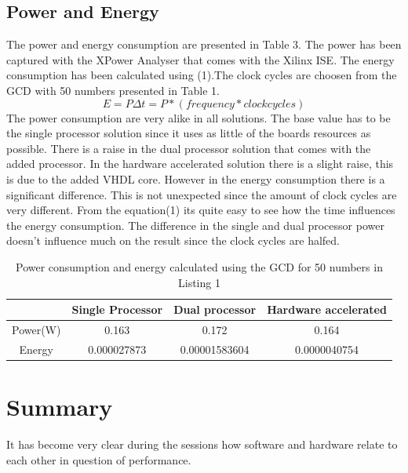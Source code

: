 \documentclass[11pt]{article}
\begin{document}
\subsection{Power and Energy}
The power and energy consumption are presented in Table 3. The power has been captured with the XPower Analyser that comes with the Xilinx ISE. The energy consumption has been calculated using (1).The clock cycles are choosen from the GCD with 50 numbers presented in Table 1. 
\begin{equation}
E = P \Delta t = P *(frequency*clock cycles)
\end{equation}
The power consumption are very alike in all solutions. The base value has to be the single processor solution since it uses as little of the boards resources as possible. There is a raise in the dual processor solution that comes with the added processor. In the hardware accelerated solution there is a slight raise, this is due to the added VHDL core.
However in the energy consumption there is a significant difference. This is not unexpected since the amount of clock cycles are very different. From the equation(1) its quite easy to see how the time influences the energy consumption. The difference in the single and dual processor power doesn't influence much on the result since the clock cycles are halfed.

\begin{table}[htbp]
   \centering
   \begin{tabular}{@{} cccc @{}} %
      \toprule
      \cmidrule(r){1-2} %
		& Single Processor	& Dual processor	& Hardware accelerated\\
      \midrule
      Power(W)	& 0.163			& 0.172			& 0.164\\

      Energy	& 0.000027873 		& 0.00001583604		& 0.0000040754\\
      \bottomrule
   \end{tabular}
   \caption{Power consumption and energy calculated using the GCD for 50 numbers in Listing 1}
   \label{tab:Power}
\end{table}

\section{Summary\label{sec:summary}}
It has become very clear during the sessions how software and hardware relate to each other in question of performance.



\end{document}
